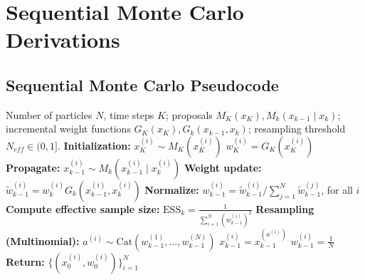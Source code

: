 \newpage
\appendix

\newpage
\section{Sequential Monte Carlo Derivations}

\subsection{Sequential Monte Carlo Pseudocode} \label{app:smc_psuedocode}

\begin{algorithm}[H]
\caption{Sequential Monte Carlo (SMC)}
\label{alg:smc}
\begin{algorithmic}[1]
\REQUIRE Number of particles $N$, time steps $K$; proposals $M_K(x_K), M_k(x_{k-1} \mid x_{k})$; incremental weight functions $G_K(x_K), G_k(x_{k-1},x_k)$; resampling threshold $N_{eff} \in (0,1]$.
\STATE \textbf{Initialization:}
    \STATE $x_K^{(i)} \sim M_K(x^{(i)}_K)$
    \STATE $w_K^{(i)} = G_K(x^{(i)}_K)$
\ENDFOR
{}
        \STATE \textbf{Propagate:} $x_{k-1}^{(i)} \sim M_k(x^{(i)}_{k-1} \mid x^{(i)}_{k})$ 
        \STATE \textbf{Weight update:} $\tilde{w}_{k-1}^{(i)} = w^{(i)}_{k} G_k(x_{k-1}^{(i)}, x_k^{(i)})$
    \ENDFOR
    \STATE \textbf{Normalize:} $w_{k-1}^{(i)} = \tilde{w}_{k-1}^{(i)} \Big/ \sum_{j=1}^N \tilde{w}_{k-1}^{(j)}$, for all $i$
    \STATE \textbf{Compute effective sample size:} $\mathrm{ESS}_k = \frac{1}{\sum_{i=1}^N (w_{k-1}^{(i)})^2}$
        \STATE \textbf{Resampling (Multinomial):}
            \STATE $a^{(i)} \sim \mathrm{Cat}(w_{k-1}^{(1)}, \dots, w_{k-1}^{(N)})$
            \STATE $x_{k-1}^{(i)} = x_{k-1}^{(a^{(i)})}$
            \STATE $w_{k-1}^{(i)} = \frac{1}{N}$
        \ENDFOR
    \ENDIF
\ENDFOR
%
\STATE \textbf{Return:} $\{(x_0^{(i)}, w_0^{(i)})\}_{i=1}^N$
\end{algorithmic}
\end{algorithm}

